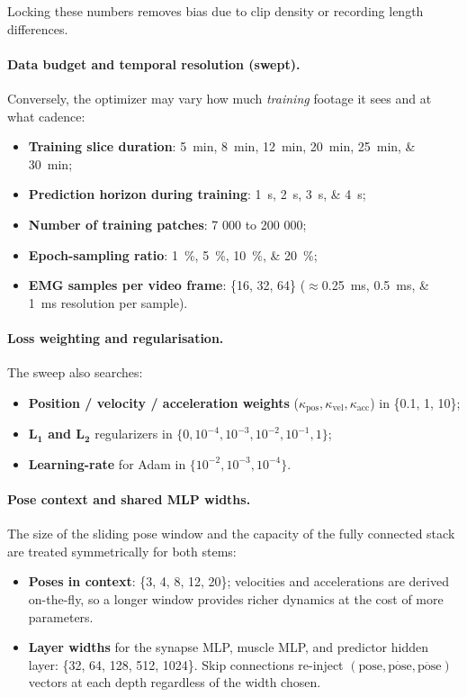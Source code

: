 Locking these numbers removes bias due to clip density or recording length
differences.

\paragraph{Data budget and temporal resolution (swept).}
Conversely, the optimizer may vary how much \emph{training} footage it sees and at what cadence:

\begin{itemize}
  \item \textbf{Training slice duration}: \SIlist{5;8;12;20;25;30}{min};
  \item \textbf{Prediction horizon during training}: \SIlist{1;2;3;4}{s};
  \item \textbf{Number of training patches}: 7 000 to 200 000;
  \item \textbf{Epoch-sampling ratio}: \SIlist{1;5;10;20}{\%};
  \item \textbf{EMG samples per video frame}: \{16, 32, 64\}
        (\(\approx\)\SIlist{0.25;0.5;1}{ms} resolution per sample).
\end{itemize}

\paragraph{Loss weighting and regularisation.}
The sweep also searches:

\begin{itemize}
  \item \textbf{Position / velocity / acceleration weights}
        (\(\kappa_{\text{pos}},\kappa_{\text{vel}},\kappa_{\text{acc}}\))
        in \{0.1, 1, 10\};
  \item \textbf{L\(_\mathbf{1}\) and L\(_\mathbf{2}\)} regularizers in
        \(\{0,10^{-4},10^{-3},10^{-2},10^{-1},1\}\);
  \item \textbf{Learning-rate} for Adam in \(\{10^{-2},10^{-3},10^{-4}\}\).
\end{itemize}

\paragraph{Pose context and shared MLP widths.}
The size of the sliding pose window and the capacity of the fully connected stack are treated symmetrically for both stems:

\begin{itemize}
  \item \textbf{Poses in context}: \{3, 4, 8, 12, 20\};
        velocities and accelerations are derived on-the-fly, so a longer
        window provides richer dynamics at the cost of more parameters.
  \item \textbf{Layer widths} for the synapse MLP, muscle MLP, and predictor
        hidden layer: \{32, 64, 128, 512, 1024\}.
        Skip connections re-inject \((\text{pose},\dot{\text{pose}},
        \ddot{\text{pose}})\) vectors at each depth regardless of the width
        chosen.
\end{itemize}

